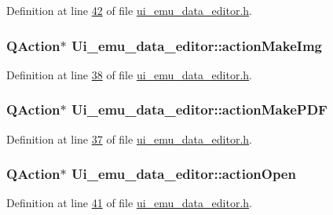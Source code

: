 Definition at line \hyperlink{a00138_source_l00042}{42} of file \hyperlink{a00138_source}{ui\+\_\+emu\+\_\+data\+\_\+editor.\+h}.

\hypertarget{a00079_a345313e538e5ef49cd27c1fc0bdd4173}{
\subsubsection[{action\+Make\+Img}]{\setlength{\rightskip}{0pt plus 5cm}Q\+Action$\ast$ Ui\+\_\+emu\+\_\+data\+\_\+editor\+::action\+Make\+Img}}\label{a00079_a345313e538e5ef49cd27c1fc0bdd4173}


Definition at line \hyperlink{a00138_source_l00038}{38} of file \hyperlink{a00138_source}{ui\+\_\+emu\+\_\+data\+\_\+editor.\+h}.

\hypertarget{a00079_af013c084ff0ed9ae39a60aa7a39bdd91}{
\subsubsection[{action\+Make\+P\+D\+F}]{\setlength{\rightskip}{0pt plus 5cm}Q\+Action$\ast$ Ui\+\_\+emu\+\_\+data\+\_\+editor\+::action\+Make\+P\+D\+F}}\label{a00079_af013c084ff0ed9ae39a60aa7a39bdd91}


Definition at line \hyperlink{a00138_source_l00037}{37} of file \hyperlink{a00138_source}{ui\+\_\+emu\+\_\+data\+\_\+editor.\+h}.

\hypertarget{a00079_a3ceb57268680eb23f6a3d522b303bb43}{
\subsubsection[{action\+Open}]{\setlength{\rightskip}{0pt plus 5cm}Q\+Action$\ast$ Ui\+\_\+emu\+\_\+data\+\_\+editor\+::action\+Open}}\label{a00079_a3ceb57268680eb23f6a3d522b303bb43}


Definition at line \hyperlink{a00138_source_l00041}{41} of file \hyperlink{a00138_source}{ui\+\_\+emu\+\_\+data\+\_\+editor.\+h}.

